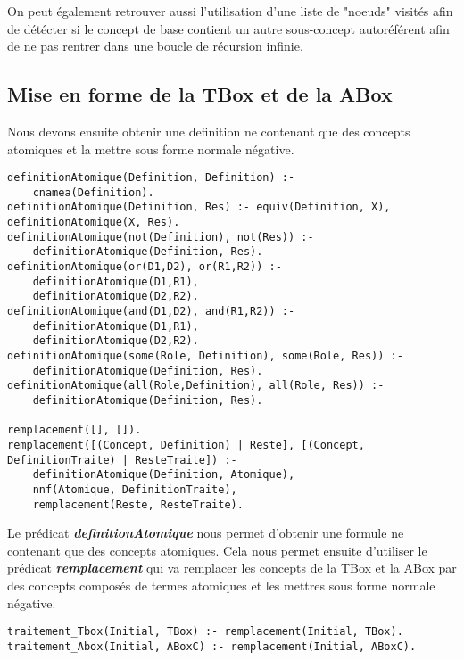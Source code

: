 \documentclass{rapportECL}
\begin{document}
On peut également retrouver aussi l'utilisation d'une liste de "noeuds" visités afin de détécter si le concept de base contient un autre sous-concept autoréférent afin de ne pas rentrer dans une boucle de récursion infinie.

\subsection{Mise en forme de la TBox et de la ABox}

Nous devons ensuite obtenir une definition ne contenant que des concepts atomiques et la mettre sous forme normale négative.

\begin{lstlisting}[style=prologStyle, caption={Mise en forme}, label={mef}]
definitionAtomique(Definition, Definition) :-
    cnamea(Definition).
definitionAtomique(Definition, Res) :- equiv(Definition, X), definitionAtomique(X, Res).
definitionAtomique(not(Definition), not(Res)) :-
    definitionAtomique(Definition, Res).
definitionAtomique(or(D1,D2), or(R1,R2)) :-
    definitionAtomique(D1,R1),
    definitionAtomique(D2,R2).
definitionAtomique(and(D1,D2), and(R1,R2)) :-
    definitionAtomique(D1,R1),
    definitionAtomique(D2,R2).
definitionAtomique(some(Role, Definition), some(Role, Res)) :-
    definitionAtomique(Definition, Res).
definitionAtomique(all(Role,Definition), all(Role, Res)) :-
    definitionAtomique(Definition, Res).

remplacement([], []).
remplacement([(Concept, Definition) | Reste], [(Concept, DefinitionTraite) | ResteTraite]) :-
    definitionAtomique(Definition, Atomique),
    nnf(Atomique, DefinitionTraite),
    remplacement(Reste, ResteTraite).
\end{lstlisting}

\label{definitionAt}

Le prédicat \textbf{\textit{definitionAtomique}} nous permet d'obtenir une formule ne contenant que des concepts atomiques. Cela nous permet ensuite d'utiliser le prédicat \textbf{\textit{remplacement}} qui va remplacer les concepts de la TBox et la ABox par des concepts composés de termes atomiques et les mettres sous forme normale négative.

\begin{lstlisting}[style=prologStyle, caption={Traitement}, label={traitement}]
traitement_Tbox(Initial, TBox) :- remplacement(Initial, TBox).
traitement_Abox(Initial, ABoxC) :- remplacement(Initial, ABoxC).
\end{lstlisting}
\end{document}
